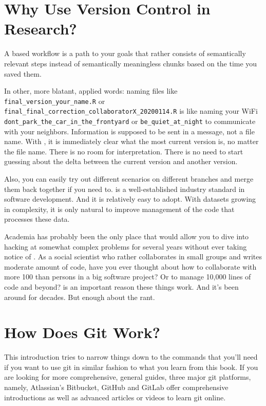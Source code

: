 \documentclass[
  12pt,
  letterpaper,
]{krantz}
\begin{document}
\hypertarget{why-use-version-control-in-research}{%
\section{Why Use Version Control in
Research?}\label{why-use-version-control-in-research}}

A  based workflow is a path to your goals that
rather consists of semantically relevant steps instead of semantically
meaningless chunks based on the time you saved them.

In other, more blatant, applied words: naming files like
\texttt{final\_version\_your\_name.R} or
\texttt{final\_final\_correction\_collaboratorX\_20200114.R} is like
naming your WiFi \texttt{dont\_park\_the\_car\_in\_the\_frontyard} or
\texttt{be\_quiet\_at\_night} to communicate with your neighbors.
Information is supposed to be sent in a message, not a file name. With
, it is immediately clear what the most current
version is, no matter the file name. There is no room for
interpretation. There is no need to start guessing about the delta
between the current version and another version.

Also, you can easily try out different scenarios on different branches
and merge them back together if you need to.  is
a well-established industry standard in software development. And it is
relatively easy to adopt. With datasets growing in complexity, it is
only natural to improve management of the code that processes these
data.

Academia has probably been the only place that would allow you to dive
into hacking at somewhat complex problems for several years without ever
taking notice of . As a social scientist who
rather collaborates in small groups and writes moderate amount of code,
have you ever thought about how to collaborate with more 100 than
persons in a big software project? Or to manage 10,000 lines of code and
beyond?  is an important reason these things
work. And it's been around for decades. But enough about the rant.

\hypertarget{how-does-git-work}{%
\section{How Does Git Work?}\label{how-does-git-work}}

This introduction tries to narrow things down to the commands that
you'll need if you want to use git in similar fashion to what
you learn from this book. If you are looking for more comprehensive,
general guides, three major git platforms, namely, Atlassian's
Bitbucket, GitHub and
GitLab offer comprehensive introductions as well as
advanced articles or videos to learn git online.
\end{document}
